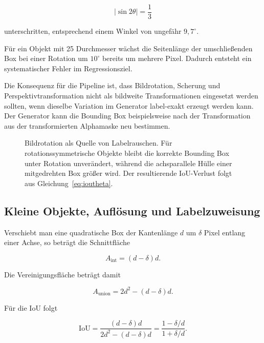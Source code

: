 \begin{equation}
|\sin 2\theta|=\frac{1}{3}
\end{equation}

unterschritten, entsprechend einem Winkel von ungefähr $9{,}7^\circ$.

Für ein Objekt mit 25\px{} Durchmesser wächst die Seitenlänge der umschließenden Box bei einer Rotation um $10^\circ$ bereits um mehrere Pixel. Dadurch entsteht ein systematischer Fehler im Regressionsziel.

Die Konsequenz für die Pipeline ist, dass Bildrotation, Scherung und Perspektivtransformation nicht als bildweite Transformationen eingesetzt werden sollten, wenn dieselbe Variation im Generator label-exakt erzeugt werden kann. Der Generator kann die Bounding Box beispielsweise nach der Transformation aus der transformierten Alphamaske neu bestimmen.

\begin{figure}[htbp]
\centering
\caption[Boxaufblähung unter Bildrotation]{Bildrotation als Quelle von Labelrauschen. Für rotationssymmetrische Objekte bleibt die korrekte Bounding Box unter Rotation unverändert, während die achsparallele Hülle einer mitgedrehten Box größer wird. Der resultierende IoU-Verlust folgt aus Gleichung~\eqref{eq:ioutheta}.}
\label{abb:boxrotation}
\end{figure}

\subsection{Kleine Objekte, Auflösung und Labelzuweisung}
\label{sec:ioukleinobjekt}

Verschiebt man eine quadratische Box der Kantenlänge $d$ um $\delta$ Pixel entlang einer Achse, so beträgt die Schnittfläche

\begin{equation}
A_{\mathrm{int}}
=
(d-\delta)d.
\end{equation}

Die Vereinigungsfläche beträgt damit

\begin{equation}
A_{\mathrm{union}}
=
2d^2-(d-\delta)d.
\end{equation}

Für die IoU folgt

\begin{equation}
\mathrm{IoU}
=
\frac{(d-\delta)d}
{2d^2-(d-\delta)d}
=
\frac{1-\delta/d}
{1+\delta/d}.
\label{eq:ioushift}
\end{equation}

